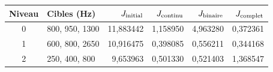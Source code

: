 \begin{tabular}{clrrrr}
\toprule
Niveau & Cibles (Hz) & $J_{\rm initial}$ & $J_{\rm continu}$ & $J_{\rm binaire}$ & $J_{\rm complet}$\\
\midrule
0 & 800, 950, 1300 & 11,883442 & 1,158950 & 4,963280 & 0,372361\\
1 & 600, 800, 2650 & 10,916475 & 0,398085 & 0,556211 & 0,344168\\
2 & 250, 400, 800 & 9,653963 & 0,501330 & 0,521403 & 1,368547\\
\bottomrule
\end{tabular}

